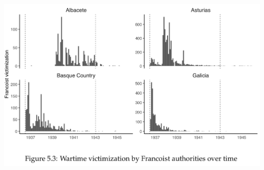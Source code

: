 \documentclass[aspectratio=43]{beamer}
\begin{document}
\begin{frame}
\begin{minipage}{0.4\textwidth}
  \includegraphics[width = \textwidth]{img/dissplot_time}
\end{minipage}

\end{frame}
\end{document}
